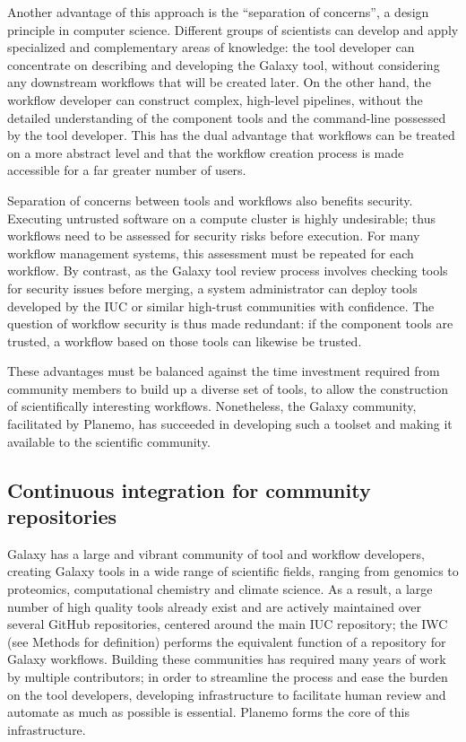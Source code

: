 Another advantage of this approach is the ``separation of concerns'', a
design principle in computer science. Different groups of scientists can
develop and apply specialized and complementary areas of knowledge: the
tool developer can concentrate on describing and developing the Galaxy
tool, without considering any downstream workflows that will be created
later. On the other hand, the workflow developer can construct complex,
high-level pipelines, without the detailed understanding of the
component tools and the command-line possessed by the tool developer.
This has the dual advantage that workflows can be treated on a more
abstract level and that the workflow creation process is made accessible
for a far greater number of users.

Separation of concerns between tools and workflows also benefits
security. Executing untrusted software on a compute cluster is highly
undesirable; thus workflows need to be assessed for security risks
before execution. For many workflow management systems, this assessment
must be repeated for each workflow. By contrast, as the Galaxy tool
review process involves checking tools for security issues before
merging, a system administrator can deploy tools developed by the IUC or
similar high-trust communities with confidence. The question of workflow
security is thus made redundant: if the component tools are trusted, a
workflow based on those tools can likewise be trusted.

These advantages must be balanced against the time investment required
from community members to build up a diverse set of tools, to allow the
construction of scientifically interesting workflows. Nonetheless, the
Galaxy community, facilitated by Planemo, has succeeded in developing
such a toolset and making it available to the scientific community.

\subsection*{Continuous integration for community
repositories}

Galaxy has a large and vibrant community of tool and workflow
developers, creating Galaxy tools in a wide range of scientific fields,
ranging from genomics to proteomics, computational chemistry and climate
science. As a result, a large number of high quality tools already exist
and are actively maintained over several GitHub repositories, centered
around the main IUC repository; the IWC (see Methods for definition)
performs the equivalent function of a repository for Galaxy workflows.
Building these communities has required many years of work by multiple
contributors; in order to streamline the process and ease the burden on
the tool developers, developing infrastructure to facilitate human
review and automate as much as possible is essential. Planemo forms the
core of this infrastructure.

